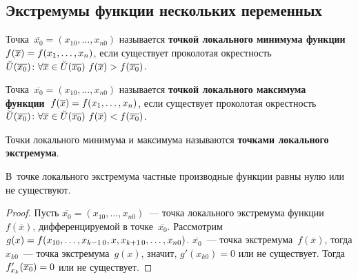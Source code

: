 \subsection{Экстремумы функции нескольких переменных}
 Точка~$\overline{x_0} = (x_{10}, \ldots, x_{n0})$ называется \textbf{точкой локального минимума функции~$f(\overline x) \opbr= f(x_1, \ldots, \allowbreak x_n)$}, если существует проколотая окрестность
$\breve U(\overline{x_0}) \colon \forall \overline x \in \breve U(\overline{x_0}) \ \allowbreak
f(\overline x) \opbr> f(\overline{x_0})$.
	
 Точка~$\overline{x_0} = (x_{10}, \ldots, x_{n0})$ называется \textbf{точкой локального максимума функции~$f(\overline x) \opbr= f(x_1, \ldots, \allowbreak x_n)$}, если существует проколотая окрестность
$\breve U(\overline{x_0}) \colon \forall \overline x \in \breve U(\overline{x_0}) \ \allowbreak
f(\overline x) \opbr< f(\overline{x_0})$.

 Точки локального минимума и максимума называются \textbf{точками локального экстремума}.
	
\begin{theorem}
В~точке локального экстремума частные производные функции равны нулю или не существуют.
\end{theorem}
\begin{proof}
Пусть $\overline{x_0} = (x_{10}, \ldots, x_{n0})$~--- точка локального экстремума функции~$f(\overline x)$, дифференцируемой в точке~$\overline{x_0}$.
Рассмотрим
$g(x) \opbr= f(x_{10}, \ldots, \allowbreak x_{k-1\,0}, x, x_{k+1\,0}, \ldots, \allowbreak x_{n0})$.
$\overline{x_0}$~--- точка экстремума~$f(\overline x)$, тогда $x_{k0}$~--- точка экстремума~$g(x)$, значит, $g'(x_{k0}) = 0$ или не существует.
Тогда $f_{x_k}'(\overline{x_0}) \opbr= 0$ или не существует.
\end{proof}

